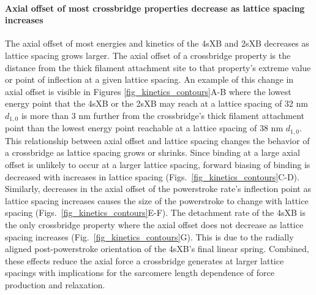 \documentclass[]{article}
\begin{document}
\paragraph{Axial offset of most crossbridge properties decrease as lattice spacing increases} %
The axial offset of most energies and kinetics of the 4sXB and 2sXB decreases as lattice spacing grows larger.
The axial offset of a crossbridge property is the distance from the thick filament attachment site to that property's extreme value or point of inflection at a given lattice spacing. 
An example of this change in axial offset is visible in Figures \ref{fig_kinetics_contours}A-B where the lowest energy point that the 4sXB or the 2sXB may reach at a lattice spacing of 32 nm $d_{1,0}$ is more than 3 nm further from the crossbridge's thick filament attachment point than the lowest energy point reachable at a lattice spacing of 38 nm $d_{1,0}$.
This relationship between axial offset and lattice spacing changes the behavior of a crossbridge as lattice spacing grows or shrinks.
Since binding at a large axial offset is unlikely to occur at a larger lattice spacing, forward biasing of binding is decreased with increases in lattice spacing (Figs.~\ref{fig_kinetics_contours}C-D). 
Similarly, decreases in the axial offset of the powerstroke rate's inflection point as lattice spacing increases causes the size of the powerstroke to change with lattice spacing (Figs.~\ref{fig_kinetics_contours}E-F).
The detachment rate of the 4sXB is the only crossbridge property where the axial offset does not decrease as lattice spacing increases (Fig.~\ref{fig_kinetics_contours}G).
This is due to the radially aligned post-powerstroke orientation of the 4sXB's final linear spring. 
Combined, these effects reduce the axial force a crossbridge generates at larger lattice spacings with implications for the sarcomere length dependence of force production and relaxation. 
\end{document}
